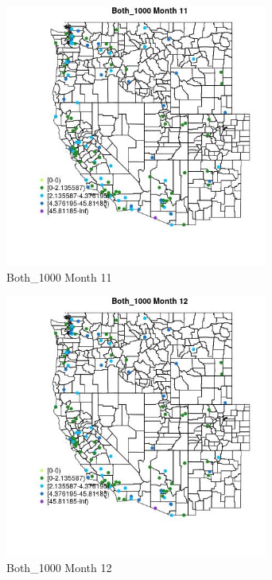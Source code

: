 \begin{figure} 
\centering  
\includegraphics[width=0.77\textwidth]{Code_Outputs/Report_ML_input_PM25_Step4_part_e_de_duplicated_aves_MapObsMo11Both_1000.jpg} 
\caption{\label{fig:Report_ML_input_PM25_Step4_part_e_de_duplicated_avesMapObsMo11Both_1000}Both_1000 Month 11} 
\end{figure} 
 

\begin{figure} 
\centering  
\includegraphics[width=0.77\textwidth]{Code_Outputs/Report_ML_input_PM25_Step4_part_e_de_duplicated_aves_MapObsMo12Both_1000.jpg} 
\caption{\label{fig:Report_ML_input_PM25_Step4_part_e_de_duplicated_avesMapObsMo12Both_1000}Both_1000 Month 12} 
\end{figure} 
 

